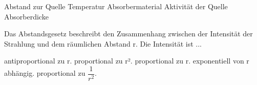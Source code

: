 \documentclass[11pt]{exam}
\begin{document}
\begin{questions}
\begin{choices}
	\choice Abstand zur Quelle
	\choice Temperatur
	\choice Absorbermaterial
	\choice Aktivität der Quelle
	\choice Absorberdicke
\end{choices}

\vspace{3mm}\question Das Abstandsgesetz beschreibt den Zusammenhang zwischen der Intensität der Strahlung und dem räumlichen Abstand r. Die Intensität ist ...

\begin{choices}
	\choice antiproportional zu r.
	\choice proportional zu r².
	\choice proportional zu r.
	\choice exponentiell von r abhängig.
	\choice proportional zu \( \dfrac{1}{r^2} \).
\end{choices}

\vspace{3mm}\end{questions}
\end{document}
